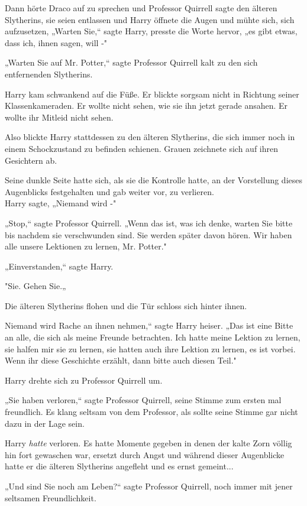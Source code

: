 {Dann hörte Draco auf zu sprechen und Professor Quirrell sagte den älteren Slytherins, sie seien entlassen und Harry öffnete die Augen und mühte sich, sich aufzusetzen, „Warten Sie,“ sagte Harry, presste die Worte hervor, „es gibt etwas, dass ich, ihnen sagen, will -"

„Warten Sie auf Mr. Potter,“ sagte Professor Quirrell kalt zu den sich entfernenden Slytherins.

Harry kam schwankend auf die Füße. Er blickte sorgsam nicht in Richtung seiner Klassenkameraden. Er wollte nicht sehen, wie sie ihn jetzt gerade ansahen. Er wollte ihr Mitleid nicht sehen.

Also blickte Harry stattdessen zu den älteren Slytherins, die sich immer noch in einem Schockzustand zu befinden schienen. Grauen zeichnete sich auf ihren Gesichtern ab.

Seine dunkle Seite hatte sich, als sie die Kontrolle hatte, an der Vorstellung dieses Augenblicks festgehalten und gab weiter vor, zu verlieren.\\ Harry sagte, „Niemand wird -"

„Stop,“ sagte Professor Quirrell. „Wenn das ist, was ich denke, warten Sie bitte bis nachdem sie verschwunden sind. Sie werden später davon hören. Wir haben alle unsere Lektionen zu lernen, Mr. Potter."

„Einverstanden,“ sagte Harry.

"Sie. Gehen Sie.„

Die älteren Slytherins flohen und die Tür schloss sich hinter ihnen.

Niemand wird Rache an ihnen nehmen,“ sagte Harry heiser. „Das ist eine Bitte an alle, die sich als meine Freunde betrachten. Ich hatte meine Lektion zu lernen, sie halfen mir sie zu lernen, sie hatten auch ihre Lektion zu lernen, es ist vorbei. Wenn ihr diese Geschichte erzählt, dann bitte auch diesen Teil."

Harry drehte sich zu Professor Quirrell um.

„Sie haben verloren,“ sagte Professor Quirrell, seine Stimme zum ersten mal freundlich. Es klang seltsam von dem Professor, als sollte seine Stimme gar nicht dazu in der Lage sein.

Harry \emph{hatte} verloren. Es hatte Momente gegeben in denen der kalte Zorn völlig hin fort gewaschen war, ersetzt durch Angst und während dieser Augenblicke hatte er die älteren Slytherins angefleht und es ernst gemeint...

„Und sind Sie noch am Leben?“ sagte Professor Quirrell, noch immer mit jener seltsamen Freundlichkeit.

}
